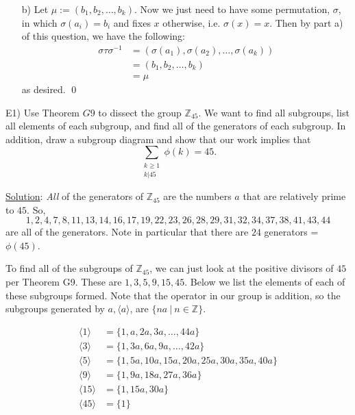 \documentclass{article}
\begin{document}
\begin{enumerate}
Therefore $\sigma\tau (x) = (\sigma(a_1), \sigma(a_2), \ldots, \sigma(a_k)) \sigma (x)$ for all $x$ and hence equations (1) and (2) are equivalently true. \qed 
	\item[b)] Let $\mu := (b_1, b_2, \ldots, b_k)$. Now we just need to have some permutation, $\sigma$, in which  $\sigma(a_i) = b_i$ and fixes $x$ otherwise, i.e. $\sigma(x) = x$. Then by part a) of this question, we have the following:
\begin{align*}
	\sigma\tau\sigma^{-1} &= (\sigma(a_1), \sigma(a_2), \ldots, \sigma(a_k)) \\
	 &=(b_1, b_2, \ldots, b_k) \\
	 &= \mu
\end{align*}
as desired. \qed \\
\end{enumerate}

E1) Use Theorem $G9$ to dissect the group $\mathbb{Z}_{45}.$ We want to find all subgroups, list all elements of each subgroup, and find all of the generators of each subgroup. In addition, draw a subgroup diagram and show that our work implies that 
$$\sum\limits_{\substack{k \geq 1 \\ k \rvert 45}} \phi(k) = 45.$$

\underline{Solution}: \textit{All} of the generators of $\mathbb{Z}_{45}$ are the numbers $a$ that are relatively prime to $45.$ So, 
$$1, 2, 4, 7, 8, 11, 13, 14, 16, 17, 19, 22, 23, 26, 28, 29, 31, 32, 34, 37, 38, 41, 43, 44$$
are all of the generators. Note in particular that there are $24$ generators = $\phi(45)$.

To find all of the subgroups of $\mathbb{Z}_{45}$, we can just look at the positive divisors of $45$ per Theorem G9. These are $1, 3, 5, 9, 15, 45.$ Below we list the elements of each of these subgroups formed. Note that the operator in our group is addition, so the subgroups generated by $a, \langle a \rangle$, are $\{na \ \vert \ n \in \mathbb{Z} \}.$  \pagebreak

\begin{align*}
	\langle 1 \rangle &= \{1, a, 2a, 3a, \ldots, 44a \} \\
	\langle 3 \rangle &= \{1, 3a, 6a, 9a, \ldots, 42a \} \\
	\langle 5 \rangle &= \{1, 5a, 10a, 15a, 20a, 25a, 30a, 35a, 40a \} \\
	\langle 9 \rangle &= \{1, 9a, 18a, 27a, 36a \} \\
	\langle 15 \rangle &= \{1, 15a, 30a \} \\
	\langle 45 \rangle &= \{1 \} 
\end{align*}
\end{document}
